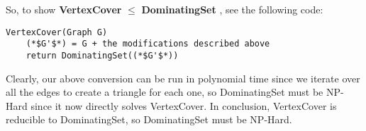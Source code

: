 \documentclass{article}
\providecommand{\reducible}[2]{
  \textbf{#1} $\leq$ \textbf{#2}
}
\begin{document}
So, to show \reducible{VertexCover}{DominatingSet}, see the following code:
\begin{lstlisting}
VertexCover(Graph G)
	(*$G'$*) = G + the modifications described above
	return DominatingSet((*$G'$*)) 
\end{lstlisting}
Clearly, our above conversion can be run in polynomial time since we iterate over all the edges to create a triangle for each one, so DominatingSet must be NP-Hard since it now directly solves VertexCover.  In conclusion, VertexCover is reducible to DominatingSet, so DominatingSet must be NP-Hard.
\end{document}
